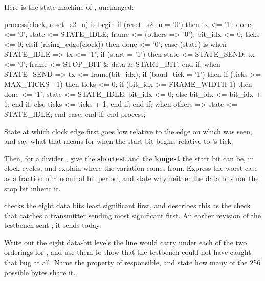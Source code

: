  Here is the state machine of , unchanged:

\begin{vhdlcode}
process(clock, reset_s2_n) is
begin
    if (reset_s2_n = '0') then
        tx <= '1'; done <= '0'; state <= STATE_IDLE;
        frame <= (others => '0'); bit_idx <= 0; ticks <= 0;
    elsif (rising_edge(clock)) then
        done <= '0';
        case (state) is
            when STATE_IDLE =>
                tx <= '1';
                if (start = '1') then
                    state <= STATE_SEND;
                    tx    <= '0';
                    frame <= STOP_BIT & data & START_BIT;
                end if;
            when STATE_SEND =>
                tx <= frame(bit_idx);
                if (baud_tick = '1') then
                    if (ticks >= MAX_TICKS - 1) then
                        ticks <= 0;
                        if (bit_idx >= FRAME_WIDTH-1) then
                            done <= '1'; state <= STATE_IDLE; bit_idx <= 0;
                        else
                            bit_idx <= bit_idx + 1;
                        end if;
                    else
                        ticks <= ticks + 1;
                    end if;
                end if;
            when others =>
                state <= STATE_IDLE;
        end case;
    end if;
end process;
\end{vhdlcode}

\noindent State at which clock edge  first goes low relative to the edge on which
 was seen, and say what that means for when the start bit begins relative to
's tick.

Then, for a divider , give the \textbf{shortest} and the \textbf{longest} the start bit
can be, in clock cycles, and explain where the variation comes from. Express the worst case as a
fraction of a nominal bit period, and state why neither the data bits nor the stop bit inherit it.

  checks the eight data bits least significant first, and 
describes this as the check that catches a transmitter sending most significant first. An earlier
revision of the testbench sent ; it sends  today.

Write out the eight data-bit levels the line would carry under each of the two orderings for
, and use them to show that the testbench could not have caught that bug at all. Name
the property of  responsible, and state how many of the 256 possible bytes share it.

